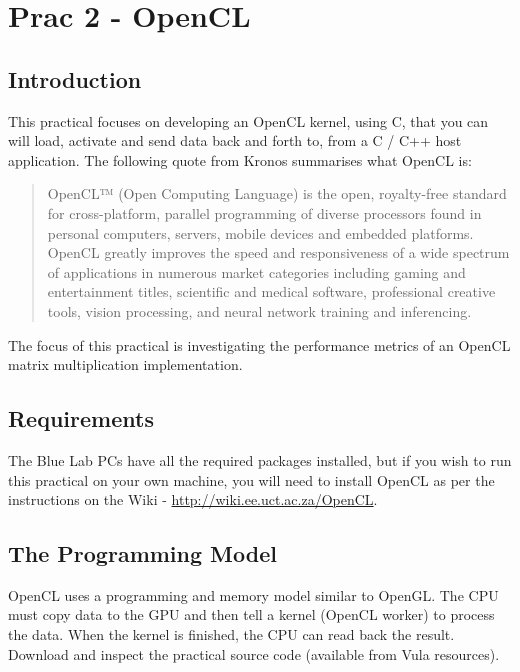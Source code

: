 \newpage
\section{Prac 2 - OpenCL}
\label{sec:Prac2}

\subsection{Introduction}

This practical focuses on  developing an OpenCL kernel, using C, that you can will load, activate and send data back and forth to, from a C / C++ host application. The following quote from Kronos \cite{opencl_khronos} summarises what  OpenCL is:

\begin{quote}
    OpenCL™ (Open Computing Language) is the open, royalty-free standard for cross-platform, parallel programming of diverse processors found in personal computers, servers, mobile devices and embedded platforms. OpenCL greatly improves the speed and responsiveness of a wide spectrum of applications in numerous market categories including gaming and entertainment titles, scientific and medical software, professional creative tools, vision processing, and neural network training and inferencing. \cite{opencl_khronos}
\end{quote}

The focus of this practical is investigating the performance metrics of an OpenCL matrix multiplication implementation.

\subsection{Requirements}
The Blue Lab PCs have all the required packages installed, but if you wish to run this practical on your own machine, you will need to install OpenCL as per the instructions on the Wiki - \href{http://wiki.ee.uct.ac.za/OpenCL}{http://wiki.ee.uct.ac.za/OpenCL}.

\subsection{The Programming Model}
OpenCL uses a programming and memory model similar to OpenGL. The CPU must copy data to the GPU and then tell a kernel (OpenCL worker) to process the data. When the kernel is finished, the CPU can read back the result. Download and inspect the practical source code (available from Vula resources).

